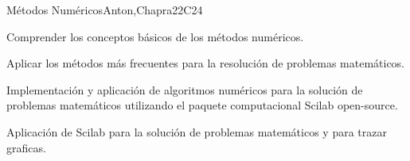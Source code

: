 \begin{syllabus}
\begin{unit}{Métodos Numéricos}{}{Anton,Chapra}{22}{C24}
   \begin{learningoutcomes}
      \item Comprender los conceptos básicos de los métodos numéricos.
      \item Aplicar los métodos más frecuentes para la resolución de problemas matemáticos.
      \item Implementación y aplicación de algoritmos numéricos para la solución de problemas matemáticos utilizando el paquete computacional Scilab open-source.
      \item Aplicación de Scilab para la solución de problemas matemáticos y para trazar  graficas.
      \end{learningoutcomes}
\end{unit}

\begin{coursebibliography}
\end{coursebibliography}

\end{syllabus}
